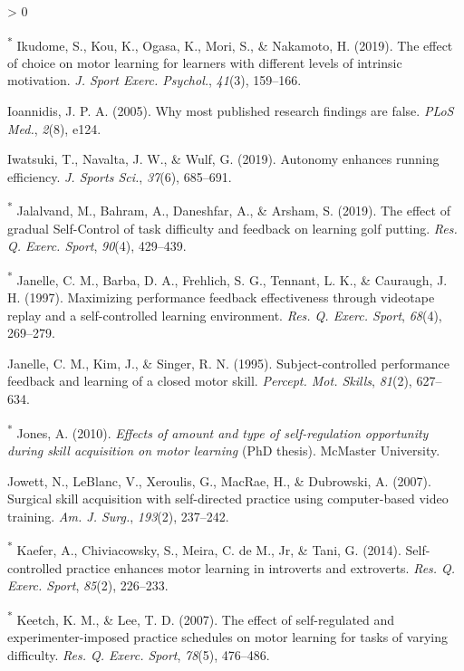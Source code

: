 \documentclass[
  english,
  man,floatsintext]{apa7}
\newlength{\cslhangindent}
\newenvironment{CSLReferences}[2] %
 {%
  \setlength{\parindent}{0pt}
  \ifodd #1 \everypar{\setlength{\hangindent}{\cslhangindent}}\ignorespaces\fi
  \ifnum #2 > 0
  \setlength{\parskip}{#2\baselineskip}
  \fi
 }%
 {}
\begin{document}
\begin{CSLReferences}{1}{0}
\leavevmode\hypertarget{ref-Ikudome2019-ru}{}%
\textsuperscript{*} Ikudome, S., Kou, K., Ogasa, K., Mori, S., \& Nakamoto, H. (2019). The effect of choice on motor learning for learners with different levels of intrinsic motivation. \emph{J. Sport Exerc. Psychol.}, \emph{41}(3), 159--166.

\leavevmode\hypertarget{ref-Ioannidis2005-km}{}%
Ioannidis, J. P. A. (2005). Why most published research findings are false. \emph{PLoS Med.}, \emph{2}(8), e124.

\leavevmode\hypertarget{ref-Iwatsuki2019-tf}{}%
Iwatsuki, T., Navalta, J. W., \& Wulf, G. (2019). Autonomy enhances running efficiency. \emph{J. Sports Sci.}, \emph{37}(6), 685--691.

\leavevmode\hypertarget{ref-Jalalvand2019-im}{}%
\textsuperscript{*} Jalalvand, M., Bahram, A., Daneshfar, A., \& Arsham, S. (2019). The effect of gradual {Self-Control} of task difficulty and feedback on learning golf putting. \emph{Res. Q. Exerc. Sport}, \emph{90}(4), 429--439.

\leavevmode\hypertarget{ref-Janelle1997-ht}{}%
\textsuperscript{*} Janelle, C. M., Barba, D. A., Frehlich, S. G., Tennant, L. K., \& Cauraugh, J. H. (1997). Maximizing performance feedback effectiveness through videotape replay and a self-controlled learning environment. \emph{Res. Q. Exerc. Sport}, \emph{68}(4), 269--279.

\leavevmode\hypertarget{ref-Janelle1995-rj}{}%
Janelle, C. M., Kim, J., \& Singer, R. N. (1995). Subject-controlled performance feedback and learning of a closed motor skill. \emph{Percept. Mot. Skills}, \emph{81}(2), 627--634.

\leavevmode\hypertarget{ref-jones2010-qw}{}%
\textsuperscript{*} Jones, A. (2010). \emph{Effects of amount and type of self-regulation opportunity during skill acquisition on motor learning} (PhD thesis). McMaster University.

\leavevmode\hypertarget{ref-Jowett2007-et}{}%
Jowett, N., LeBlanc, V., Xeroulis, G., MacRae, H., \& Dubrowski, A. (2007). Surgical skill acquisition with self-directed practice using computer-based video training. \emph{Am. J. Surg.}, \emph{193}(2), 237--242.

\leavevmode\hypertarget{ref-Kaefer2014-bs}{}%
\textsuperscript{*} Kaefer, A., Chiviacowsky, S., Meira, C. de M., Jr, \& Tani, G. (2014). Self-controlled practice enhances motor learning in introverts and extroverts. \emph{Res. Q. Exerc. Sport}, \emph{85}(2), 226--233.

\leavevmode\hypertarget{ref-Keetch2007-yp}{}%
\textsuperscript{*} Keetch, K. M., \& Lee, T. D. (2007). The effect of self-regulated and experimenter-imposed practice schedules on motor learning for tasks of varying difficulty. \emph{Res. Q. Exerc. Sport}, \emph{78}(5), 476--486.


\end{CSLReferences}
\end{document}
